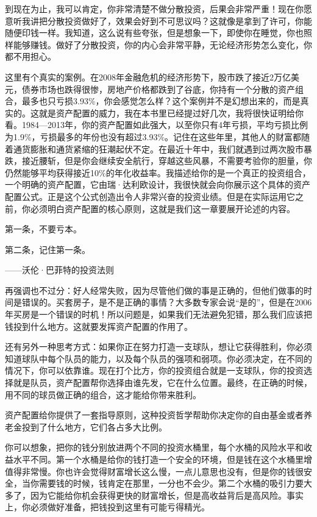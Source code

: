 到现在为止，我可以肯定，你非常清楚不做分散投资，后果会非常严重！现在你愿意听我讲把分散投资做好了，效果会好到不可思议吗？这就像是拿到了许可，你能随便印钱一样。我知道，这么说有些夸张，但是想象一下，即使你在睡觉，你也照样能够赚钱。做好了分散投资，你的内心会非常平静，无论经济形势怎么变化，你都不用担心。

这里有个真实的案例。在2008年金融危机的经济形势下，股市跌了接近2万亿美元，债券市场也跌得很惨，房地产价格都跌到了谷底，你持有一个分散的资产组合，最多也只亏损3.93\%，你会感觉怎么样？这个案例并不是幻想出来的，而是真实的。这就是资产配置的威力，我在本书里已经提过好几次，我将很快证明给你看。1984—2013年，你的资产配置如此强大，以至你只有4年亏损，平均亏损比例为1.9\%，亏损最多的年份也没有超过3.93\%。记住在这些年里，其他人的财富都随着通货膨胀和通货紧缩的狂潮起伏不定。在最近十年中，我们就遇到过两次股市暴跌，接近腰斩，但是你会继续安全航行，穿越这些风暴，不需要考验你的胆量，你仍然能够平均获得接近10\%的年化收益率。我描述给你的是一个真正的投资组合，一个明确的资产配置，它由瑞·达利欧设计，我很快就会向你展示这个具体的资产配置公式。正是这个公式创造出令人非常兴奋的投资业绩。但是在实际运用它之前，你必须明白资产配置的核心原则，这就是我们这一章要展开论述的内容。


\begin{BookQuote}
第一条，不要亏本。

第二条，记住第一条。

\hfill ——沃伦·巴菲特的投资法则
\end{BookQuote}

再强调也不过分：好人经常失败，因为尽管他们做的事是正确的，但他们做事的时间是错误的。买套房子，是不是正确的事情？大多数专家会说“是的”，但是在2006年买房是一个错误的时机！所以问题是，如果我们无法避免犯错，那么我们应该把钱投到什么地方。这就要发挥资产配置的作用了。

还有另外一种思考方式：如果你正在努力打造一支球队，想让它获得胜利，你必须知道球队中每个队员的能力，以及每个队员的强项和弱项。你必须决定，在不同的情况下，你可以依靠谁。现在打个比方，你的投资组合就是一支球队，你的投资选择就是队员，资产配置帮你选择由谁先发，它在什么位置。最终，在正确的时候，用不同的球员做正确的组合，这才能给你带来胜利。

资产配置给你提供了一套指导原则，这种投资哲学帮助你决定你的自由基金或者养老金投到了什么地方，它们各占多大比例。

你可以想象，把你的钱分别放进两个不同的投资水桶里，每个水桶的风险水平和收益水平不同。第一个水桶是给你的钱打造一个安全的环境，但是钱在这个水桶里增值得非常慢。你也许会觉得财富增长这么慢，一点儿意思也没有，但是你的钱很安全，当你需要钱的时候，钱肯定在那里，一分也不会少。第二个水桶的吸引力要大多了，因为它能给你机会获得更快的财富增长，但是高收益背后是高风险。事实上，你必须做好准备，把钱投到这里有可能亏得精光。

